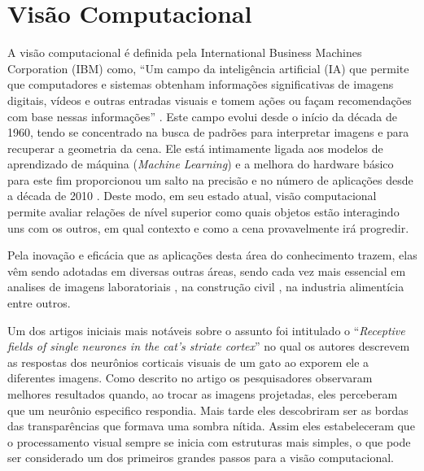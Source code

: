 \begin{description}
\end{description}



\section{Visão Computacional}

A visão computacional é definida pela  International Business Machines Corporation (IBM) como, ``Um campo da inteligência artificial (IA) que permite que computadores e sistemas obtenham informações significativas de imagens digitais, vídeos e outras entradas visuais e tomem ações ou façam recomendações com base nessas informações'' \cite{IBMCv}. 
Este campo evolui desde o início da década de 1960, tendo se concentrado na busca de padrões para interpretar imagens e para recuperar a geometria da cena. Ele está intimamente ligada aos modelos de aprendizado de máquina (\textit{Machine Learning}) e a melhora do hardware básico para este fim proporcionou um salto na precisão e no número de aplicações desde a década de 2010 \cite{ACMCv}. Deste modo, em seu estado atual, visão computacional permite avaliar relações de nível superior como quais objetos estão interagindo uns com os outros, em qual contexto e como a cena provavelmente irá progredir.

Pela inovação e eficácia que as aplicações desta área do conhecimento trazem, elas vêm sendo adotadas em diversas outras áreas, sendo cada vez mais essencial em analises de imagens laboratoriais \cite{Gao2018-dd}, na construção civil \cite{FANG2020103013,ruiz2002application}, na industria alimentícia \cite{gomes2012applications} entre outros.

Um dos artigos iniciais mais notáveis sobre o assunto foi intitulado o ``\textit{Receptive fields of single neurones in the cat’s striate cortex}'' \cite{Hubel1959-xd} no qual os autores descrevem as respostas dos neurônios corticais visuais de um gato ao exporem ele a diferentes imagens. Como descrito no artigo os pesquisadores observaram melhores resultados quando, ao trocar as imagens projetadas, eles perceberam que um neurônio especifico respondia. Mais tarde eles descobriram ser as bordas das transparências que formava uma sombra nítida. Assim eles estabeleceram que o processamento visual sempre se inicia com estruturas mais simples, o que pode ser considerado um dos primeiros grandes passos para a visão computacional.


